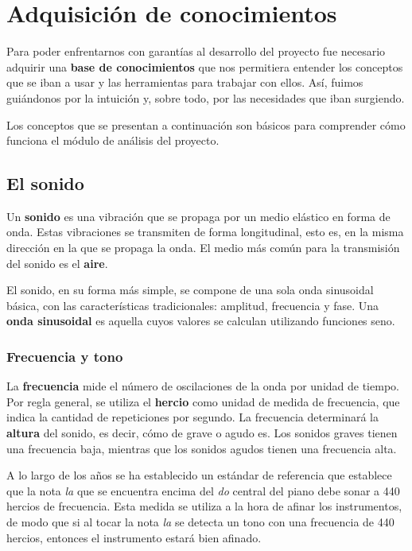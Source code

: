 \section{Adquisición de conocimientos}
Para poder enfrentarnos con garantías al desarrollo del proyecto fue necesario
adquirir una \textbf{base de conocimientos} que nos permitiera entender los
conceptos que se iban a usar y las herramientas para trabajar con ellos. Así,
fuimos guiándonos por la intuición y, sobre todo, por las necesidades que iban
surgiendo. 

Los conceptos que se presentan a continuación son básicos para comprender cómo
funciona el módulo de análisis del proyecto.

\subsection{El sonido}
Un \textbf{sonido} es una vibración que se propaga por un medio
elástico en forma de onda. Estas vibraciones se transmiten de forma
longitudinal, esto es, en la misma dirección en la que se propaga la
onda. El medio más común para la transmisión del sonido es el
\textbf{aire}. 

El sonido, en su forma más simple, se compone de una sola onda
sinusoidal básica, con las características tradicionales: amplitud,
frecuencia y fase. Una \textbf{onda sinusoidal} es aquella cuyos
valores se calculan utilizando funciones seno.

\subsubsection{Frecuencia y tono}
La \textbf{frecuencia} mide el número de oscilaciones de la onda por
unidad de tiempo. Por regla general, se utiliza el \textbf{hercio}
como unidad de medida de frecuencia, que indica la cantidad de
repeticiones por segundo. La frecuencia determinará la \textbf{altura}
del sonido, es decir, cómo de grave o agudo es. Los sonidos graves
tienen una frecuencia baja, mientras que los sonidos agudos tienen una
frecuencia alta.

A lo largo de los años se ha establecido un estándar de referencia que
establece que la nota \textit{la} que se encuentra encima del
\textit{do} central del piano debe sonar a 440 hercios de
frecuencia. Esta medida se utiliza a la hora de afinar los
instrumentos, de modo que si al tocar la nota \textit{la} se detecta
un tono con una frecuencia de 440 hercios, entonces el instrumento
estará bien afinado.

